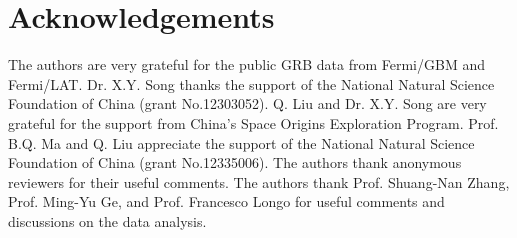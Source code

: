 \documentclass[prd,twocolumn,amsmath,amssymb,aps,linenumbers]{revtex4-2} %
\begin{document}
\section*{Acknowledgements}
The authors are very grateful for the public GRB data from Fermi/GBM and Fermi/LAT. Dr. X.Y. Song thanks the support of the National Natural Science Foundation of China (grant No.12303052). Q. Liu and Dr. X.Y. Song are very grateful for the support from China's Space Origins Exploration Program. Prof. B.Q. Ma and Q. Liu appreciate the support of the National Natural Science Foundation of China (grant No.12335006). The authors thank anonymous reviewers for their useful comments. The authors thank Prof. Shuang-Nan Zhang, Prof. Ming-Yu Ge, and Prof. Francesco Longo for useful comments and discussions on the data analysis.
\end{document}
